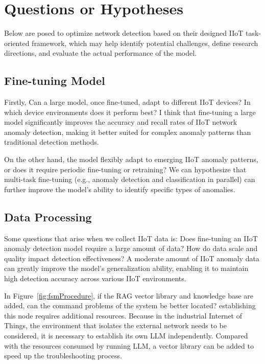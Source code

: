 \documentclass[usenatbib]{tjaa}
\begin{document}
\section{Questions or Hypotheses}
\label{sec:questions}
Below are posed to optimize network detection based on their designed IIoT task-oriented framework,
which may help identify potential challenges, define research directions,
and evaluate the actual performance of the model.

\subsection{Fine-tuning Model}
Firstly, Can a large model, once fine-tuned, adapt to different IIoT devices?
In which device environments does it perform best?
I think that fine-tuning a large model significantly improves
the accuracy and recall rates of IIoT network anomaly detection,
making it better suited for complex anomaly patterns than traditional detection methods.

On the other hand, the model flexibly adapt to emerging IIoT anomaly patterns,
or does it require periodic fine-tuning or retraining?
We can hypothesize that multi-task fine-tuning (e.g., anomaly detection and classification in parallel)
can further improve the model’s ability to identify specific types of anomalies.

\subsection{Data Processing}
Some questions that arise when we collect IIoT data is:
Does fine-tuning an IIoT anomaly detection model require a large amount of data?
How do data scale and quality impact detection effectiveness?
A moderate amount of IIoT anomaly data can greatly improve the model's generalization ability,
enabling it to maintain high detection accuracy across various IIoT environments.

In Figure~\ref{fig:fsmProcedure}, if the RAG vector library and knowledge base are added,
can the command problems of the system be better located?
establishing this node requires additional resources.
Because in the industrial Internet of Things,
the environment that isolates the external network needs to be considered,
it is necessary to establish its own LLM independently.
Compared with the resources consumed by running LLM,
a vector library can be added to speed up the troubleshooting process.
\end{document}

